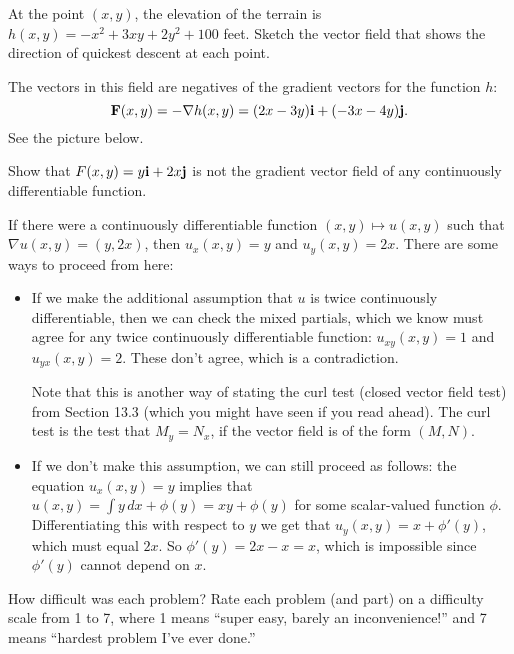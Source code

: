 \begin{problem}
  At the point $(x,y)$, the elevation of the terrain is $h(x,y)=-x^2+3xy+2y^2+100$ feet. Sketch the vector field that shows the direction of quickest descent at each point.
\end{problem}
\begin{solution}
  The vectors in this field are negatives of the gradient vectors for the function $h$:
  \[\mathbf F(x,y) = -\nabla h(x,y)=(2x-3y)\mathbf i+(-3x-4y)\mathbf j.\]
  See the picture below.
  \begin{center}
  \end{center}
\end{solution}

\begin{problem}
  Show that $F(x,y)=y\mathbf i+2x\mathbf j$ is not the gradient vector field of any continuously differentiable function.
\end{problem}
\begin{solution}
  If there were a continuously differentiable function $(x,y)\mapsto u(x,y)$ such that $\nabla u(x,y)=(y,2x)$, then $u_x(x,y)=y$ and $u_y(x,y)=2x$. There are some ways to proceed from here:
  \begin{itemize}
    \item If we make the additional assumption that $u$ is twice continuously differentiable, then we can check the mixed partials, which we know must agree for any twice continuously differentiable function: $u_{xy}(x,y)=1$ and $u_{yx}(x,y)=2$. These don't agree, which is a contradiction.

    Note that this is another way of stating the curl test (closed vector field test) from Section 13.3 (which you might have seen if you read ahead). The curl test is the test that $M_y=N_x$, if the vector field is of the form $(M,N)$.
    \item If we don't make this assumption, we can still proceed as follows: the equation $u_x(x,y)=y$ implies that $u(x,y)=\int y\,dx+\phi(y)=xy+\phi(y)$ for some scalar-valued function $\phi$. Differentiating this with respect to $y$ we get that $u_y(x,y)=x+\phi'(y)$, which must equal $2x$. So $\phi'(y)=2x-x=x$, which is impossible since $\phi'(y)$ cannot depend on $x$.
  \end{itemize}
\end{solution}

\begin{problem}
  How difficult was each problem? Rate each problem (and part) on a difficulty scale from 1 to 7, where 1 means ``super easy, barely an inconvenience!'' and 7 means ``hardest problem I've ever done.''
\end{problem}
